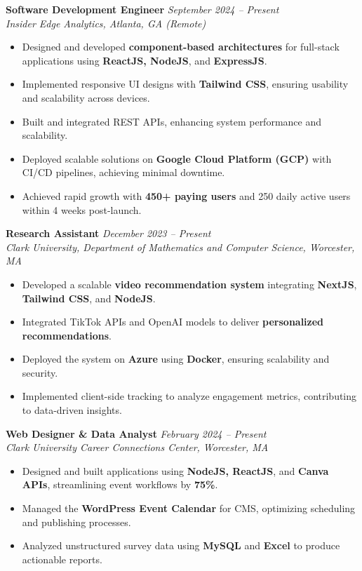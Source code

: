 \documentclass[a4paper,10pt]{article}
\begin{document}
\textbf{Software Development Engineer} \hfill \textit{September 2024 -- Present}\\
\textit{Insider Edge Analytics, Atlanta, GA (Remote)}  
\begin{itemize}[leftmargin=*]
    \item Designed and developed \textbf{component-based architectures} for full-stack applications using \textbf{ReactJS, NodeJS}, and \textbf{ExpressJS}.
    \item Implemented responsive UI designs with \textbf{Tailwind CSS}, ensuring usability and scalability across devices.
    \item Built and integrated REST APIs, enhancing system performance and scalability.
    \item Deployed scalable solutions on \textbf{Google Cloud Platform (GCP)} with CI/CD pipelines, achieving minimal downtime.
    \item Achieved rapid growth with \textbf{450+ paying users} and 250 daily active users within 4 weeks post-launch.
\end{itemize}

\textbf{Research Assistant} \hfill \textit{December 2023 -- Present}\\
\textit{Clark University, Department of Mathematics and Computer Science, Worcester, MA}  
\begin{itemize}[leftmargin=*]
    \item Developed a scalable \textbf{video recommendation system} integrating \textbf{NextJS}, \textbf{Tailwind CSS}, and \textbf{NodeJS}.
    \item Integrated TikTok APIs and OpenAI models to deliver \textbf{personalized recommendations}.
    \item Deployed the system on \textbf{Azure} using \textbf{Docker}, ensuring scalability and security.
    \item Implemented client-side tracking to analyze engagement metrics, contributing to data-driven insights.
\end{itemize}

\textbf{Web Designer \& Data Analyst} \hfill \textit{February 2024 -- Present}\\
\textit{Clark University Career Connections Center, Worcester, MA}  
\begin{itemize}[leftmargin=*]
    \item Designed and built applications using \textbf{NodeJS, ReactJS}, and \textbf{Canva APIs}, streamlining event workflows by \textbf{75\%}.
    \item Managed the \textbf{WordPress Event Calendar} for CMS, optimizing scheduling and publishing processes.
    \item Analyzed unstructured survey data using \textbf{MySQL} and \textbf{Excel} to produce actionable reports.
\end{itemize}
\end{document}
